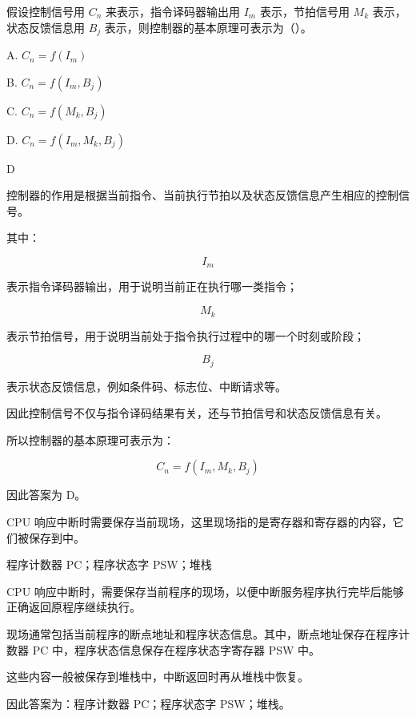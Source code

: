 
\begin{question}
假设控制信号用 $C_n$ 来表示，指令译码器输出用 $I_m$ 表示，节拍信号用 $M_k$ 表示，状态反馈信息用 $B_j$ 表示，则控制器的基本原理可表示为（）。

A. $C_n=f(I_m)$

B. $C_n=f(I_m,B_j)$

C. $C_n=f(M_k,B_j)$

D. $C_n=f(I_m,M_k,B_j)$
\end{question}

\begin{answer}
D
\end{answer}

\begin{analysisenv}
控制器的作用是根据当前指令、当前执行节拍以及状态反馈信息产生相应的控制信号。

其中：

\[
I_m
\]

表示指令译码器输出，用于说明当前正在执行哪一类指令；

\[
M_k
\]

表示节拍信号，用于说明当前处于指令执行过程中的哪一个时刻或阶段；

\[
B_j
\]

表示状态反馈信息，例如条件码、标志位、中断请求等。

因此控制信号不仅与指令译码结果有关，还与节拍信号和状态反馈信息有关。

所以控制器的基本原理可表示为：

\[
C_n=f(I_m,M_k,B_j)
\]

因此答案为 D。
\end{analysisenv}


\begin{question}
CPU 响应中断时需要保存当前现场，这里现场指的是\underline{\hspace{3cm}}寄存器和\underline{\hspace{3cm}}寄存器的内容，它们被保存到\underline{\hspace{3cm}}中。
\end{question}

\begin{answer}
程序计数器 PC；程序状态字 PSW；堆栈
\end{answer}

\begin{analysisenv}
CPU 响应中断时，需要保存当前程序的现场，以便中断服务程序执行完毕后能够正确返回原程序继续执行。

现场通常包括当前程序的断点地址和程序状态信息。其中，断点地址保存在程序计数器 PC 中，程序状态信息保存在程序状态字寄存器 PSW 中。

这些内容一般被保存到堆栈中，中断返回时再从堆栈中恢复。

因此答案为：程序计数器 PC；程序状态字 PSW；堆栈。
\end{analysisenv}

